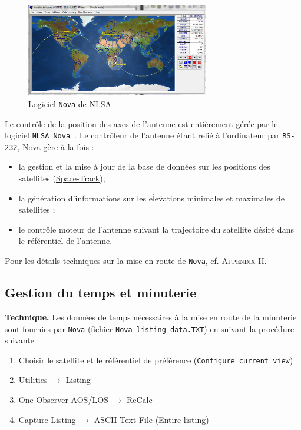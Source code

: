 \documentclass[twocolumn,pre,floats,aps,amsmath,amssymb]{revtex4}
\newenvironment{remark}[1][Remarque.]{\begin{trivlist}
\item[\hskip \labelsep {\bfseries #1}]}{\end{trivlist}}
\begin{document}
\begin{figure}[h]
  \includegraphics[width=8cm]{nova3.png}
\caption{Logiciel \texttt{Nova} de NLSA}
\label{fig:geometry}
\end{figure}

Le contr\^ole de la position des axes de l'antenne est enti\`erement g\'er\'ee par le logiciel \texttt{NLSA Nova}~\cite{nova_um}. Le contr\^oleur de l'antenne \'etant reli\'e \`a l'ordinateur par \texttt{RS-232}, Nova g\`ere \`a la fois :
\begin{itemize}
\item{la gestion et la mise \`a jour de la base de donn\'ees sur les positions des satellites (\href{https://www.space-track.org}{Space-Track});}
\item{la g\'en\'eration d'informations sur les e\'le\'vations minimales et maximales de satellites ;}
\item{le contr\^ole moteur de l'antenne suivant la trajectoire du satellite d\'esir\'e dans le r\'ef\'erentiel de l'antenne.}
\end{itemize}

\begin{remark}
  Pour les d\'etails techniques sur la mise en route de \texttt{Nova}, cf. \textsc{Appendix II}.
\end{remark}

\subsection{Gestion du temps et minuterie}

\textbf{Technique.} Les donn\'ees de temps n\'ecessaires \`a la mise en route de la minuterie sont fournies par \texttt{Nova} (fichier \texttt{Nova listing data.TXT}) en suivant la proc\'edure suivante :
\begin{enumerate}
\item {Choisir le satellite et le r\'ef\'erentiel de pr\'ef\'erence (\texttt{Configure current view})}
\item {\textup{Utilities} $\rightarrow$ \textup{Listing}}
\item {\textup{One Observer AOS/LOS} $\rightarrow$ \textup{ReCalc}}
\item {\textup{Capture Listing} $\rightarrow$ \textup{ASCII Text File} (Entire listing)}
\end{enumerate}
\end{document}
